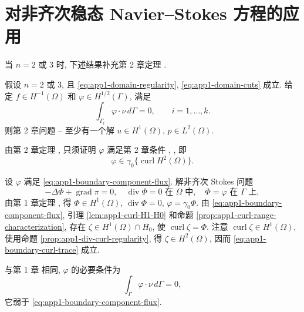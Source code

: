 \section{对非齐次稳态 Navier--Stokes 方程的应用}
\label{sec:app1-nonhomogeneous-steady}

当 $n=2$ 或 $3$ 时, 下述结果补充第 2 章定理 .

\begin{Theorem}
\label{thm:app1-nonhomogeneous-existence}
假设 $n=2$ 或 $3$, 且 \eqref{eq:app1-domain-regularity}, \eqref{eq:app1-domain-cuts} 成立. 给定 $f\in H^{-1}(\Omega)$ 和 $\varphi\in H^{1/2}(\Gamma)$, 满足
\begin{equation}
\int_{\Gamma_i}\varphi\cdot\nu\,d\Gamma=0,
\qquad i=1,\ldots,k.
\label{eq:app1-boundary-component-flux}
\end{equation}
则第 2 章问题 -- 至少有一个解 $u\in H^1(\Omega)$, $p\in L^2(\Omega)$.
\end{Theorem}

\begin{Proof}
由第 2 章定理 , 只须证明 $\varphi$ 满足第 2 章条件 , , 即
\begin{equation}
\varphi\in\gamma_0\{\operatorname{curl}H^2(\Omega)\}.
\label{eq:app1-boundary-curl-trace}
\end{equation}

\hypertarget{appendix-01-page-334}{}
设 $\varphi$ 满足 \eqref{eq:app1-boundary-component-flux}. 解非齐次 Stokes 问题
\[
-\Delta\Phi+\operatorname{grad}\pi=0,
\quad\operatorname{div}\Phi=0\text{ 在 }\Omega\text{ 中},
\quad\Phi=\varphi\text{ 在 }\Gamma\text{ 上},
\]
由第 1 章定理 , 得 $\Phi\in H^1(\Omega)$, $\operatorname{div}\Phi=0$, $\varphi=\gamma_0\Phi$. 由 \eqref{eq:app1-boundary-component-flux}, 引理 \ref{lem:app1-curl-H1-H0} 和命题 \ref{prop:app1-curl-range-characterization}, 存在 $\zeta\in H^1(\Omega)\cap H_0$, 使 $\operatorname{curl}\zeta=\Phi$. 注意 $\operatorname{curl}\zeta\in H^1(\Omega)$, 使用命题 \ref{prop:app1-div-curl-regularity}, 得 $\zeta\in H^2(\Omega)$, 因而 \eqref{eq:app1-boundary-curl-trace} 成立.
\end{Proof}

\begin{Remark}
\label{rem:app1-total-flux-necessary}
与第 1 章  相同, $\varphi$ 的必要条件为
\begin{equation}
\int_\Gamma\varphi\cdot\nu\,d\Gamma=0,
\label{eq:app1-total-boundary-flux}
\end{equation}
它弱于 \eqref{eq:app1-boundary-component-flux}.
\end{Remark}

